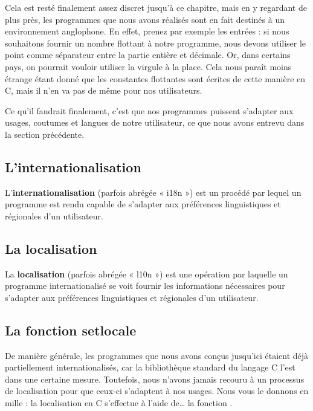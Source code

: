 Cela est resté finalement assez discret jusqu'à ce chapitre, mais en 
y regardant de plus près, les programmes que nous avons réalisés sont 
en fait destinés à un environnement anglophone. En effet, prenez par 
exemple les entrées : si nous souhaitons fournir un nombre flottant 
à notre programme, nous devons utiliser le point comme séparateur 
entre la partie entière et décimale. Or, dans certains pays, on pourrait 
vouloir utiliser la virgule à la place. Cela nous paraît moins étrange 
étant donné que les constantes flottantes sont écrites de cette manière 
en C, mais il n'en va pas de même pour nos utilisateurs.

Ce qu'il faudrait finalement, c'est que nos programmes puissent
s'adapter aux usages, coutumes et langues de notre utilisateur, ce que
nous avons entrevu dans la section précédente.

\subsection{L'internationalisation}
\label{linternationalisation}

L'\textbf{internationalisation} (parfois abrégée « i18n ») est un
procédé par lequel un programme est rendu capable de s'adapter aux
préférences linguistiques et régionales d'un utilisateur.

\subsection{La localisation}
\label{la-localisation}

La \textbf{localisation} (parfois abrégée « l10n ») est une opération
par laquelle un programme internationalisé se voit fournir les
informations nécessaires pour s'adapter aux préférences linguistiques et
régionales d'un utilisateur.

\subsection{La fonction setlocale}
\label{la-fonction-setlocale}

De manière générale, les programmes que nous avons conçus jusqu'ici
étaient déjà partiellement internationalisés, car la bibliothèque
standard du langage C l'est dans une certaine mesure. Toutefois, nous
n'avons jamais recouru à un processus de localisation pour que ceux-ci
s'adaptent à nos usages. Nous vous le donnons en mille : la localisation
en C s'effectue à l'aide de\ldots{} la fonction .

